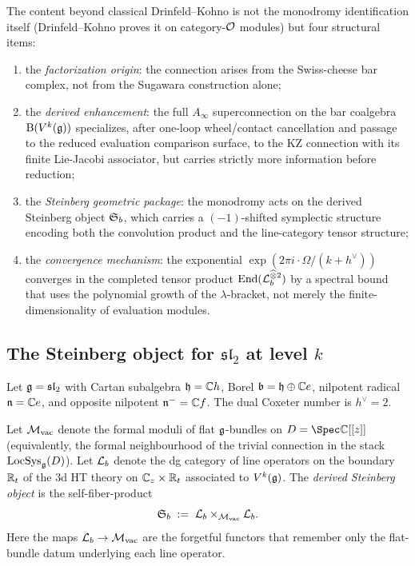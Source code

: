 The content beyond classical Drinfeld--Kohno is not the monodromy
identification itself (Drinfeld--Kohno proves it on category-$\mathcal{O}$
modules) but four structural items:
\begin{enumerate}[label=\textup{(\alph*)}]
\item the \emph{factorization origin}: the connection arises from the Swiss-cheese bar complex, not from the Sugawara construction alone;
\item the \emph{derived enhancement}: the full $A_\infty$ superconnection on the bar coalgebra $\mathrm{B}(V^k(\mathfrak{g}))$ specializes, after one-loop wheel/contact cancellation and passage to the reduced evaluation comparison surface, to the KZ connection with its finite Lie-Jacobi associator, but carries strictly more information before reduction;
\item the \emph{Steinberg geometric package}: the monodromy acts on the derived Steinberg object $\mathfrak{S}_b$, which carries a $(-1)$-shifted symplectic structure encoding both the convolution product and the line-category tensor structure;
\item the \emph{convergence mechanism}: the exponential $\exp(2\pi i \cdot \Omega/(k+h^\vee))$ converges in the completed tensor product $\mathrm{End}(\mathcal{L}_b^{\widehat\otimes 2})$ by a spectral bound that uses the polynomial growth of the $\lambda$-bracket, not merely the finite-dimensionality of evaluation modules.
\end{enumerate}

\subsection{The Steinberg object for $\mathfrak{sl}_2$ at level $k$}
\label{subsec:steinberg-sl2}

Let $\mathfrak{g} = \mathfrak{sl}_2$ with Cartan subalgebra $\mathfrak{h} = \mathbb C h$, Borel $\mathfrak{b} = \mathfrak{h} \oplus \mathbb C e$, nilpotent radical $\mathfrak{n} = \mathbb C e$, and opposite nilpotent $\mathfrak{n}^- = \mathbb C f$. The dual Coxeter number is $h^\vee = 2$.

\begin{definition}
\label{def:derived-steinberg}
Let $\mathcal{M}_{\mathrm{vac}}$ denote the formal moduli of flat $\mathfrak{g}$-bundles on $D = \Spec \CC[[z]]$ (equivalently, the formal neighbourhood of the trivial connection in the stack $\mathrm{LocSys}_{\mathfrak{g}}(D)$). Let $\mathcal{L}_b$ denote the dg category of line operators on the boundary $\mathbb R_t$ of the 3d HT theory on $\mathbb C_z \times \mathbb R_t$ associated to $V^k(\mathfrak{g})$. The \emph{derived Steinberg object} is the self-fiber-product
\[
 \mathfrak{S}_b \;:=\; \mathcal{L}_b \times_{\mathcal{M}_{\mathrm{vac}}} \mathcal{L}_b.
\]
Here the maps $\mathcal{L}_b \to \mathcal{M}_{\mathrm{vac}}$ are the forgetful functors that remember only the flat-bundle datum underlying each line operator.
\end{definition}

